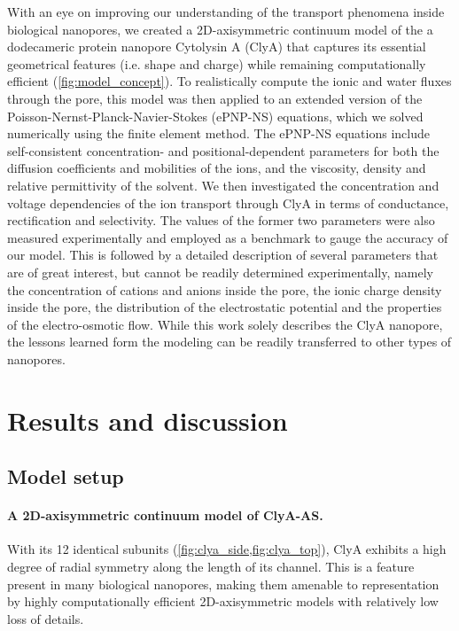\documentclass[journal=ancac3,manuscript=article,etalmode=truncate,maxauthors=0,layout=twocolumn]{achemso}
\begin{document}
With an eye on improving our understanding of the transport phenomena inside biological nanopores, we created 
a 2D-axisymmetric continuum model of the a dodecameric protein nanopore Cytolysin A (ClyA)\cite{Soskine-2013} 
that captures its essential geometrical features (i.e. shape and charge) while remaining computationally 
efficient (\cref{fig:model_concept}). To realistically compute the ionic and water fluxes through the pore, 
this model was then applied to an extended version of the Poisson-Nernst-Planck-Navier-Stokes (ePNP-NS) 
equations, which we solved numerically using the finite element method. The ePNP-NS equations include 
self-consistent concentration- and positional-dependent parameters for both the diffusion coefficients and 
mobilities of the ions, and the viscosity, density and relative permittivity of the solvent. We then 
investigated the concentration and voltage dependencies of the ion transport through ClyA in terms of 
conductance, rectification and selectivity. The values of the former two parameters were also measured 
experimentally and employed as a benchmark to gauge the accuracy of our model. This is followed by a detailed 
description of several parameters that are of great interest, but cannot be readily determined 
experimentally, namely the concentration of cations and anions inside the pore, the ionic charge density 
inside the pore, the distribution of the electrostatic potential and the properties of the electro-osmotic 
flow. While this work solely describes the ClyA nanopore, the lessons learned form the modeling can be 
readily transferred to other types of nanopores.

\section{Results and discussion}\label{sect:results}

\subsection{Model setup}

\paragraph{A 2D-axisymmetric continuum model of ClyA-AS.}
With its 12 identical subunits (\cref{fig:clya_side,fig:clya_top}), ClyA exhibits a high degree of radial 
symmetry along the length of its channel. This is a feature present in many biological nanopores, 
making them amenable to representation by highly computationally efficient 2D-axisymmetric models with 
relatively low loss of details.\cite{Pederson-2015} 
\end{document}
